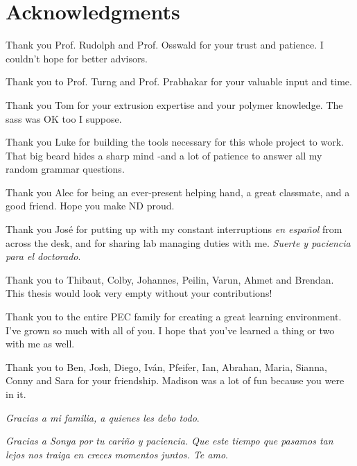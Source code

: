 \documentclass[main.tex]{subfiles}
\begin{document}
\chapter*{Acknowledgments}
{
\setlength{\parindent}{0cm}
\setlength{\parskip}{12pt}
Thank you Prof. Rudolph and Prof. Osswald for your trust and patience. I couldn't hope for better advisors.

Thank you to Prof. Turng and Prof. Prabhakar for your valuable input and time. 
     
Thank you Tom for your extrusion expertise and your polymer knowledge. The sass was OK too I suppose.

Thank you Luke for building the tools necessary for this whole project to work. That big beard hides a sharp mind -and a lot of patience to answer all my random grammar questions.

Thank you Alec for being an ever-present helping hand, a great classmate, and a good friend. Hope you make ND proud.

Thank you Jos\'e for putting up with my constant interruptions \emph{en espa\~nol} from across the desk, and for sharing lab managing duties with me. \emph{Suerte y paciencia para el doctorado}. 

Thank you to Thibaut, Colby, Johannes, Peilin, Varun, Ahmet and Brendan. This thesis would look very empty without your contributions!
    
Thank you to the entire PEC family for creating a great learning environment. I've grown so much with all of you. I hope that you've learned a thing or two with me as well.

Thank you to Ben, Josh, Diego, Iv\'an, Pfeifer, Ian, Abrahan, Maria, Sianna, Conny and Sara for your friendship. Madison was a lot of fun because you were in it.

\emph{Gracias a mi familia, a quienes les debo todo}. 

\emph{Gracias a Sonya por tu cari\~no y paciencia. Que este tiempo que pasamos tan lejos nos traiga en creces momentos juntos. Te amo}.  
}
\end{document}
